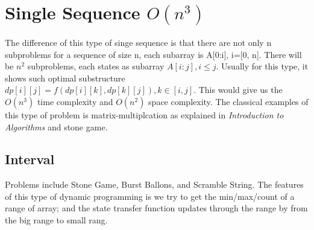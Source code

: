 \documentclass[../main.tex]{subfiles}
\begin{document}
\section{Single Sequence $O(n^3)$}
The difference of this type of singe sequence is that there are not only n subproblems for a sequence of size n, each subarray is A[0:i], i=[0, n]. There will be $n^2$ subproblems, each states as subarray $A[i:j], i \leq j$. Usually for this type, it shows such optimal substructure $dp[i][j] = f(dp[i][k], dp[k][j]), k \in [i, j]$. This would give us the $O(n^3)$ time complexity and $O(n^2)$ space complexity. The classical examples of this type of problem is matrix-multiplcation as explained in \textit{Introduction to Algorithms} and stone game. 
\label{sec_single_n3}
\subsection{Interval}
Problems include Stone Game, Burst Ballons, and Scramble String. The features of this type of dynamic programming is we try to get the min/max/count of a range of array; and the state transfer function updates through the range by from the big range to small rang.
\end{document}
